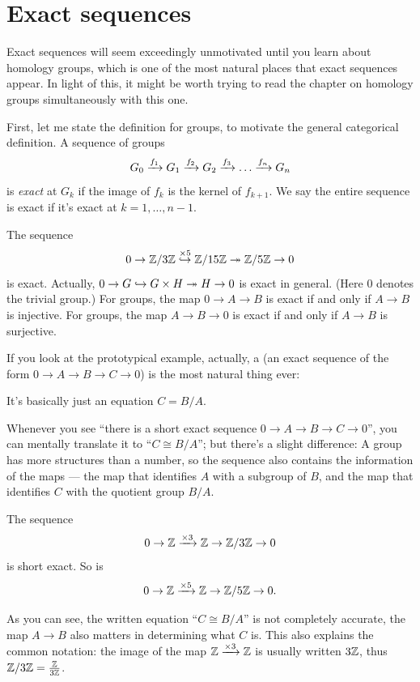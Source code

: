 \section{Exact sequences}
\label{sec:exact_sequences}
Exact sequences will seem exceedingly unmotivated until you learn about homology groups,
which is one of the most natural places that exact sequences appear.
In light of this, it might be worth trying to read the chapter on homology groups
simultaneously with this one.

First, let me state the definition for groups, to motivate the general categorical definition.
A sequence of groups
\[ G_0 \xrightarrow{f_1} G_1 \xrightarrow{f_2} G_2 \xrightarrow{f_3} \dots \xrightarrow{f_n} G_n \]
is \emph{exact} at $G_k$ if the image of $f_k$ is the kernel of $f_{k+1}$.
We say the entire sequence is exact if it's exact at $k=1,\dots,n-1$.
\begin{example}
	\listhack
	\begin{enumerate}[(a)]
		\ii The sequence
		\[ 0 \to \mathbb Z/3\mathbb Z
			\overset{\times 5}{\hookrightarrow} \mathbb Z/15\mathbb Z
			\twoheadrightarrow \mathbb Z/5\mathbb Z
			\to 0 \]
		is exact.
		Actually, $0 \to G \hookrightarrow G \times H \twoheadrightarrow H \to 0$ is exact in general.
		(Here $0$ denotes the trivial group.)
		\ii For groups, the map $0 \to A \to B$ is exact if and only if $A \to B$ is injective.
		\ii For groups, the map $A \to B \to 0$ is exact if and only if $A \to B$ is surjective.
	\end{enumerate}
\end{example}

If you look at the prototypical example, actually, a  (an exact sequence
of the form $0 \to A \to B \to C \to 0$) is the most natural thing ever:
\begin{moral}
	It's basically just an equation $C = B/A$.
\end{moral}
Whenever you see ``there is a short exact sequence $0 \to A \to B \to C \to 0$'', you
can mentally translate it to ``$C \cong B/A$''; but there's a slight difference:
A group has more structures than a number, so the sequence also contains the information of the
maps --- the map that identifies $A$ with a subgroup of $B$, and the map that identifies $C$
with the quotient group $B/A$.
\begin{example}
	\listhack
	\begin{enumerate}[(a)]
		\ii The sequence
			\[ 0 \to \mathbb Z \xrightarrow{\times 3} \mathbb Z \to \mathbb Z/3\mathbb Z \to 0 \]
		is short exact.
		\ii So is
			\[ 0 \to \mathbb Z \xrightarrow{\times 5} \mathbb Z \to \mathbb Z/5\mathbb Z \to 0. \]
	\end{enumerate}
	As you can see, the written equation ``$C \cong B/A$'' is not completely accurate, the map $A
	\to B$ also matters in determining what $C$ is. This also explains the common notation: the
	image of the map $\mathbb Z \xrightarrow{\times 3} \mathbb Z$ is usually written $3 \mathbb Z$, thus $\mathbb Z/3\mathbb Z =
	\frac{\mathbb Z}{3 \mathbb Z}$.
\end{example}

